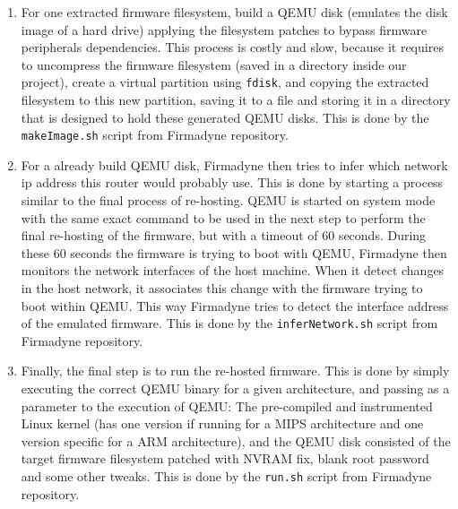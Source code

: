 \begin{enumerate}
    \item For one extracted firmware filesystem, build a QEMU disk (emulates the disk image of a hard drive) applying the filesystem patches to bypass firmware peripherals dependencies. This process is costly and slow, because it requires to uncompress the firmware filesystem (saved in a directory inside our project), create a virtual partition using {\tt fdisk}, and copying the extracted filesystem to this new partition, saving it to a file and storing it in a directory that is designed to hold these generated QEMU disks. This is done by the {\tt makeImage.sh} script from Firmadyne repository.
    
    \item For a already build QEMU disk, Firmadyne then tries to infer which network ip address this router would probably use. This is done by starting a process similar to the final process of re-hosting. QEMU is started on system mode with the same exact command to be used in the next step to perform the final re-hosting of the firmware, but with a timeout of 60 seconds. During these 60 seconds the firmware is trying to boot with QEMU, Firmadyne then monitors the network interfaces of the host machine. When it detect changes in the host network, it associates this change with the firmware trying to boot within QEMU. This way Firmadyne tries to detect the interface address of the emulated firmware. This is done by the {\tt inferNetwork.sh} script from Firmadyne repository.
    
    \item Finally, the final step is to run the re-hosted firmware. This is done by simply executing the correct QEMU binary for a given architecture, and passing as a parameter to the execution of QEMU: The pre-compiled and instrumented Linux kernel (has one version if running for a MIPS architecture and one version specific for a ARM architecture), and the QEMU disk consisted of the target firmware filesystem patched with NVRAM fix, blank root password and some other tweaks. This is done by the {\tt run.sh} script from Firmadyne repository.
\end{enumerate}

